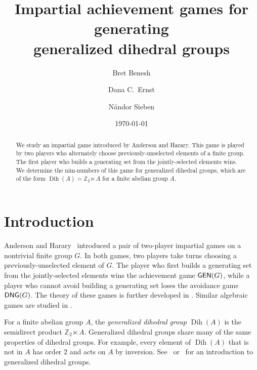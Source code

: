 \documentclass[12pt]{amsart}
\theoremstyle{definition}
\theoremstyle{definition}
\numberwithin{equation}{section}
\begin{document}
\setlength{\jot}{0pt} 
\title
[Impartial achievement games for generating generalized dihedral groups]
{Impartial achievement games for generating \\
generalized dihedral groups}

\author{Bret Benesh}
\author{Dana C.~Ernst}
\author{N\'andor Sieben}



\date{\today}

\maketitle

\begin{abstract}
We study an impartial game introduced by Anderson and Harary.  This game is played by two players who alternately choose previously-unselected elements of a finite group. The first player who builds a generating set from the jointly-selected elements wins. We determine the nim-numbers of this game for generalized dihedral groups, which are of the form ${\operatorname{Dih}}(A)= \mathbb{Z}_2 \ltimes A$ for a finite abelian group $A$.
\end{abstract}

\section{Introduction}

Anderson and Harary~\cite{anderson.harary:achievement} introduced a pair of two-player impartial games on a nontrivial finite group $G$.  In both games, two players take turns choosing a previously-unselected element of $G$. The player who first builds a generating set from the jointly-selected elements wins the achievement game ${\text{\sf GEN}}(G)$, while a player who cannot avoid building a generating set loses the avoidance game ${\text{\sf DNG}}(G)$.  
The theory of these games is further developed in \cite{Barnes,BeneshErnstSiebenSymAlt,BeneshErnstSiebenDNG,ErnstSieben}. Similar algebraic games are studied in \cite{brandenburg:algebraicGames}.

For a finite abelian group $A$, the \emph{generalized dihedral group} ${\operatorname{Dih}}(A)$ is the semidirect product $\mathbb{Z}_{2}\ltimes A$.
Generalized dihedral groups share many of the same properties of dihedral groups.  For example, every element of ${\operatorname{Dih}}(A)$ that is not in $A$ has order $2$ and acts on $A$ by inversion.  See~\cite{IsaacsFiniteGroups} or~\cite{MR0167513} for an introduction to generalized dihedral groups.
\end{document}
